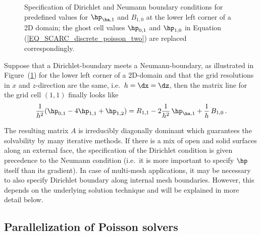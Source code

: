 \begin{figure}[ht]
\caption{Specification of Dirichlet and Neumann boundary conditions for predefined values for $\hp_{\ha,1}$ and $B_{1,0}$ at the lower left corner of a 2D domain; the ghost cell values $\hp_{0,1}$ and $\hp_{1,0}$ in Equation (\ref{EQ_SCARC_discrete_poisson_two}) are replaced correspondingly.}
\label{FIG_SCARC_bc_setting}
\end{figure}

Suppose that a Dirichlet-boundary meets a Neumann-boundary, as illustrated in Figure~(\ref{FIG_SCARC_bc_setting}) for the lower left corner of a 2D-domain and 
that the grid resolutions in $x$ and $z$-direction are the same, i.e.\ $h=\dx=\dz$, then the matrix line for the grid cell $(1,1)$ finally looks like
\begin{equation*}
\frac{1}{h^2} (\hp_{0,1} - 4\hp_{1,1} + \hp_{1,2} ) = R_{1,1} - 2\frac{1}{h^2} \, \hp_{\ha,1} + \frac{1}{h} \, B_{1,0} \,.
\end{equation*}

The resulting matrix $A$ is irreducibly diagonally dominant which guarantees the solvability by many iterative 
methods.
%
If there is a mix of open and solid surfaces along an external face, the specification of the Dirichlet condition is given precedence to the Neumann condition (i.e.\ it is more important to specify $\hp$ itself than its gradient).
%
In case of multi-mesh applications, it may be necessary to also specify Dirichlet boundary along internal mesh boundaries. However, this depends on the underlying solution technique and will be explained in more detail below.

\subsection{Parallelization of Poisson solvers}
\label{SEC_SCARC_solver}

